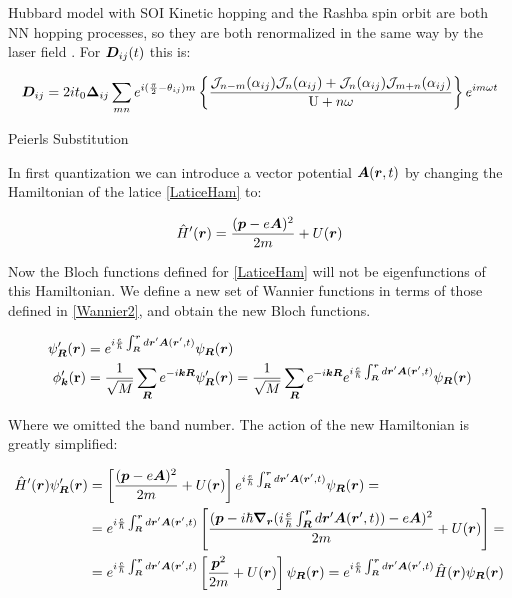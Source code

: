 \begin{section}{Hubbard model with SOI}
Kinetic hopping and the Rashba spin orbit are both NN hopping processes, so they are both renormalized in the same way by the laser field \cite{Stepanov2017}.
For $\boldsymbol{D}_{ij}(t)$ this is:

\begin{equation}
\boldsymbol{D}_{ij} = 2it_0 \boldsymbol{\Delta}_{ij} \sum_{mn}e^{i(\frac{\pi}{2}-\theta_{ij})m} \left\{ 
    \frac{\mathcal{J}_{n-m}(\alpha_{ij})\mathcal{J}_{n}(\alpha_{ij}) + \mathcal{J}_{n}(\alpha_{ij})\mathcal{J}_{m+n}(\alpha_{ij})}{\text{U}+n\omega} \right\}e^{im\omega t}
\end{equation}

\end{section}



\begin{subappendices}
\begin{section}{Peierls Substitution}
\label{AP3A}

In first quantization we can introduce a vector potential $\boldsymbol{A}(\boldsymbol{r},t)$ by changing the Hamiltonian of the latice \ref{LaticeHam} to:

\begin{equation}
\label{HamEMF}
  \hat{H}'(\boldsymbol{r}) = \frac{(\boldsymbol{p}-e\boldsymbol{A})^2}{2m} +U(\boldsymbol{r})
\end{equation}

Now the Bloch functions defined for \ref{LaticeHam} will not be eigenfunctions of this Hamiltonian. We define a new set of Wannier functions in terms of those defined in \ref{Wannier2}, and obtain the new Bloch functions. 

\begin{align}
\psi'_{\boldsymbol{R}}(\boldsymbol{r}) &= e^{i\frac{e}{\hbar}\int_{\boldsymbol{R}}^{\boldsymbol{r}} d\boldsymbol{r}'\boldsymbol{A}(\boldsymbol{r}',t)} \psi_{\boldsymbol{R}}(\boldsymbol{r}) \\
\phi'_{\boldsymbol{k}}(\textbf{r}) &= \frac{1}{\sqrt{M}}\sum_{\boldsymbol{R}} e^{-i\boldsymbol{k}\boldsymbol{R}}\psi'_{\boldsymbol{R}}(\boldsymbol{r}) = \frac{1}{\sqrt{M}}\sum_{\boldsymbol{R}} e^{-i\boldsymbol{k}\boldsymbol{R}} e^{i\frac{e}{\hbar}\int_{\boldsymbol{R}}^{\boldsymbol{r}} d\boldsymbol{r}'\boldsymbol{A}(\boldsymbol{r}',t)} \psi_{\boldsymbol{R}}(\boldsymbol{r})
\end{align}

Where we omitted the band number. The action of the new Hamiltonian is greatly simplified:

\begin{align*}
\hat{H}'(\boldsymbol{r}) \psi'_{\boldsymbol{R}} (\boldsymbol{r}) &= \left[ \frac{(\boldsymbol{p}-e\boldsymbol{A})^2}{2m} +U(\boldsymbol{r}) \right] e^{i\frac{e}{\hbar}\int_{\boldsymbol{R}}^{\boldsymbol{r}} d\boldsymbol{r}'\boldsymbol{A}(\boldsymbol{r}',t)} \psi_{\boldsymbol{R}}(\boldsymbol{r}) = \\
&=e^{i\frac{e}{\hbar}\int_{\boldsymbol{R}}^{\boldsymbol{r}} d\boldsymbol{r}'\boldsymbol{A}(\boldsymbol{r}',t)} \left[ \frac{(\boldsymbol{p} - i\hbar \boldsymbol{\nabla_r}(i\frac{e}{\hbar}\int_{\boldsymbol{R}}^{\boldsymbol{r}} d\boldsymbol{r}'\boldsymbol{A}(\boldsymbol{r}',t)) -e\boldsymbol{A})^2}{2m} +U(\boldsymbol{r}) \right] = \\
&= e^{i\frac{e}{\hbar}\int_{\boldsymbol{R}}^{\boldsymbol{r}} d\boldsymbol{r}'\boldsymbol{A}(\boldsymbol{r}',t)} \left[ \frac{\boldsymbol{p}^2}{2m} + U(\boldsymbol{r}) \right] \psi_{\boldsymbol{R}}(\boldsymbol{r}) = e^{i\frac{e}{\hbar}\int_{\boldsymbol{R}}^{\boldsymbol{r}} d\boldsymbol{r}'\boldsymbol{A}(\boldsymbol{r}',t)} \hat{H}(\boldsymbol{r}) \psi_{\boldsymbol{R}}(\boldsymbol{r})
\end{align*}


\end{section}
\end{subappendices}
